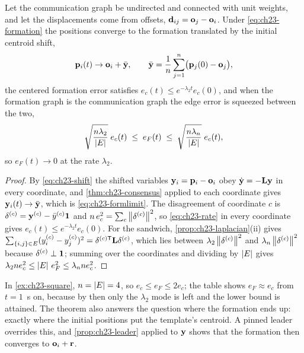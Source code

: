 \begin{theorem}
\label{thm:ch23-formation}
Let the communication graph be undirected and connected with unit weights,
and let the displacements come from offsets, $\mathbf{d}_{ij} = \mathbf{o}_j - \mathbf{o}_i$.
Under \cref{eq:ch23-formation} the positions converge to the formation
translated by the initial centroid shift,
\begin{equation}
  \mathbf{p}_i(t) \to \mathbf{o}_i + \bar{\mathbf{y}}, \qquad
  \bar{\mathbf{y}} = \frac{1}{n}\sum_{j=1}^{n}\bigl(\mathbf{p}_j(0) - \mathbf{o}_j\bigr),
  \label{eq:ch23-formlimit}
\end{equation}
the centered formation error satisfies $e_c(t) \le e^{-\lambda_2 t} e_c(0)$,
and when the formation graph is the communication graph the edge error is
squeezed between the two,
\begin{equation}
  \sqrt{\frac{n\lambda_2}{\left\lvert E \right\rvert}}\; e_c(t) \;\le\; e_F(t) \;\le\; \sqrt{\frac{n\lambda_n}{\left\lvert E \right\rvert}}\; e_c(t),
  \label{eq:ch23-sandwich}
\end{equation}
so $e_F(t) \to 0$ at the rate $\lambda_2$.
\end{theorem}
\begin{proof}
By \cref{eq:ch23-shift} the shifted variables $\mathbf{y}_i = \mathbf{p}_i -
\mathbf{o}_i$ obey $\dot{\mathbf{y}} = -\mathbf{L}\mathbf{y}$ in every coordinate, and
\cref{thm:ch23-consensus} applied to each coordinate gives $\mathbf{y}_i(t) \to
\bar{\mathbf{y}}$, which is \cref{eq:ch23-formlimit}. The disagreement of
coordinate $c$ is $\mathbf{\delta}^{(c)} = \mathbf{y}^{(c)} - \bar{y}^{(c)}\mathbf{1}$
and $n\,e_c^2 = \sum_c \left\lVert \mathbf{\delta}^{(c)} \right\rVert^2$, so \cref{eq:ch23-rate}
in every coordinate gives $e_c(t) \le e^{-\lambda_2 t}e_c(0)$. For the
sandwich, \cref{prop:ch23-laplacian}(ii) gives $\sum_{\left\{ i,j \right\}\in E}
(y^{(c)}_i - y^{(c)}_j)^2 = \mathbf{\delta}^{(c)\mathsf{T}}\mathbf{L}\mathbf{\delta}^{(c)}$,
which lies between $\lambda_2\left\lVert \mathbf{\delta}^{(c)} \right\rVert^2$ and
$\lambda_n\left\lVert \mathbf{\delta}^{(c)} \right\rVert^2$ because $\mathbf{\delta}^{(c)} \perp
\mathbf{1}$; summing over the coordinates and dividing by $\left\lvert E \right\rvert$ gives
$\lambda_2 n e_c^2 \le \left\lvert E \right\rvert\, e_F^2 \le \lambda_n n e_c^2$.
\end{proof}

In \cref{ex:ch23-square}, $n = \left\lvert E \right\rvert = 4$, so $e_c \le e_F \le 2e_c$; the
table shows $e_F \approx e_c$ from $t = 1$~s on, because by then only the
$\lambda_2$ mode is left and the lower bound is attained. The theorem also
answers the question where the formation ends up: exactly where the initial
positions put the template's centroid. A pinned leader overrides this, and
\cref{prop:ch23-leader} applied to $\mathbf{y}$ shows that the formation then
converges to $\mathbf{o}_i + \mathbf{r}$.

